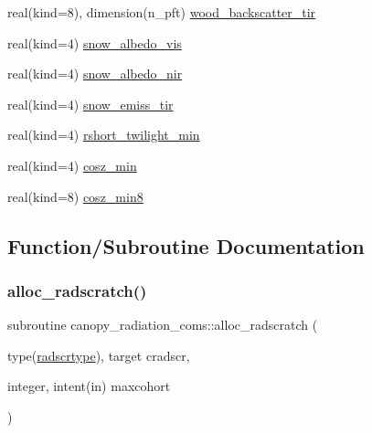 \begin{DoxyCompactItemize}
\item 
real(kind=8), dimension(n\+\_\+pft) \hyperlink{namespacecanopy__radiation__coms_abd52ebed6eef6a200b0f0635d02910fe}{wood\+\_\+backscatter\+\_\+tir}
\item 
real(kind=4) \hyperlink{namespacecanopy__radiation__coms_a1cc8ec955321a89af09a5000f559027a}{snow\+\_\+albedo\+\_\+vis}
\item 
real(kind=4) \hyperlink{namespacecanopy__radiation__coms_a6e9ba20bb9e4cdec42f508154e237a0d}{snow\+\_\+albedo\+\_\+nir}
\item 
real(kind=4) \hyperlink{namespacecanopy__radiation__coms_ad1a9ec223aca622a0fd93fe20cf980d5}{snow\+\_\+emiss\+\_\+tir}
\item 
real(kind=4) \hyperlink{namespacecanopy__radiation__coms_a3a226b3cec6a97cda6b397806da31988}{rshort\+\_\+twilight\+\_\+min}
\item 
real(kind=4) \hyperlink{namespacecanopy__radiation__coms_a7bcf7a71dd9f42a8d1516a4dc0588317}{cosz\+\_\+min}
\item 
real(kind=8) \hyperlink{namespacecanopy__radiation__coms_ae2a63ff3c4f0ba6dfdb7efd1a865e63a}{cosz\+\_\+min8}
\end{DoxyCompactItemize}


\subsection{Function/\+Subroutine Documentation}
\mbox{\label{namespacecanopy__radiation__coms_abf436863eec6f51fbcad29f1a0ad8833}} 
\subsubsection{\texorpdfstring{alloc\+\_\+radscratch()}{alloc\_radscratch()}}
{\footnotesize\ttfamily subroutine canopy\+\_\+radiation\+\_\+coms\+::alloc\+\_\+radscratch (\begin{DoxyParamCaption}\item[{type(\hyperlink{structcanopy__radiation__coms_1_1radscrtype}{radscrtype}), target}]{cradscr,  }\item[{integer, intent(in)}]{maxcohort }\end{DoxyParamCaption})}

